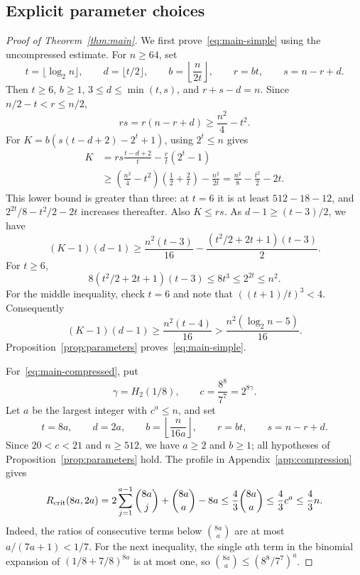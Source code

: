 \subsection{Explicit parameter choices}

\begin{proof}[Proof of Theorem~\ref{thm:main}]
We first prove~\eqref{eq:main-simple} using the uncompressed estimate.
For $n\ge64$, set
\[
 t=\lfloor\log_2 n\rfloor,\qquad d=\lfloor t/2\rfloor,\qquad
 b=\left\lfloor\frac{n}{2t}\right\rfloor,\qquad
 r=bt,\qquad s=n-r+d.
\]
Then $t\ge6$, $b\ge1$, $3\le d\le\min(t,s)$, and $r+s-d=n$.
Since $n/2-t<r\le n/2$,
\[
 rs=r(n-r+d)\ge\frac{n^2}{4}-t^2.
\]
For $K=b(s(t-d+2)-2^t+1)$, using $2^t\le n$ gives
\begin{align*}
 K&=rs\frac{t-d+2}{t}-\frac rt(2^t-1)\\
  &\ge\left(\frac{n^2}{4}-t^2\right)
          \left(\frac12+\frac2t\right)-\frac{n^2}{2t}
   =\frac{n^2}{8}-\frac{t^2}{2}-2t.
\end{align*}
This lower bound is greater than three: at $t=6$ it is at least
$512-18-12$, and $2^{2t}/8-t^2/2-2t$ increases thereafter.
Also $K\le rs$. As $d-1\ge(t-3)/2$, we have
\[
 (K-1)(d-1)\ge
 \frac{n^2(t-3)}{16}
 -\frac{(t^2/2+2t+1)(t-3)}2.
\]
For $t\ge6$,
\[
 8(t^2/2+2t+1)(t-3)\le8t^3\le2^{2t}\le n^2.
\]
For the middle inequality, check $t=6$ and note that
$((t+1)/t)^3<4$. Consequently
\[
 (K-1)(d-1)\ge\frac{n^2(t-4)}{16}
 >\frac{n^2(\log_2 n-5)}{16}.
\]
Proposition~\ref{prop:parameters} proves~\eqref{eq:main-simple}.

For~\eqref{eq:main-compressed}, put
\[
 \gamma=H_2(1/8),\qquad c=\frac{8^8}{7^7}=2^{8\gamma}.
\]
Let $a$ be the largest integer with $c^a\le n$, and set
\[
 t=8a,\qquad d=2a,\qquad b=\left\lfloor\frac{n}{16a}\right\rfloor,
 \qquad r=bt,\qquad s=n-r+d.
\]
Since $20<c<21$ and $n\ge512$, we have $a\ge2$ and $b\ge1$;
all hypotheses of Proposition~\ref{prop:parameters} hold.
The profile in Appendix~\ref{app:compression} gives
\begin{equation}\label{eq:entropy-cost}
 R_{\rm crit}(8a,2a)
 =2\sum_{j=1}^{a-1}\binom{8a}{j}+\binom{8a}{a}-8a
 \le\frac43\binom{8a}{a}\le\frac43c^a\le\frac43n.
\end{equation}
Indeed, the ratios of consecutive terms below $\binom{8a}{a}$
are at most $a/(7a+1)<1/7$. For the next inequality, the single
$a$th term in the binomial expansion of $(1/8+7/8)^{8a}$ is at
most one, so $\binom{8a}{a}\le (8^8/7^7)^a$.


\end{proof}
